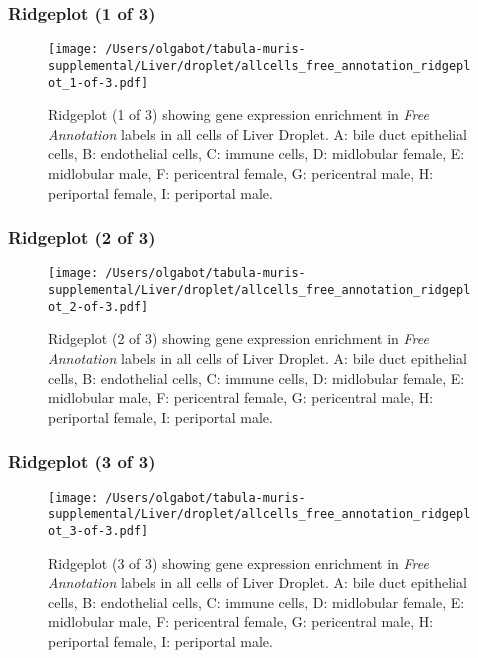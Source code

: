 \subsubsection{Ridgeplot (1 of 3)}
\begin{figure}[h]
\centering
\texttt{[image: /Users/olgabot/tabula-muris-supplemental/Liver/droplet/allcells\_free\_annotation\_ridgeplot\_1-of-3.pdf]}

\caption{ Ridgeplot (1 of 3)  showing gene expression enrichment in \emph{Free Annotation} labels in all cells of Liver Droplet. A: bile duct epithelial cells, B: endothelial cells, C: immune cells, D: midlobular female, E: midlobular male, F: pericentral female, G: pericentral male, H: periportal female, I: periportal male.}
\end{figure}


\clearpage

\subsubsection{Ridgeplot (2 of 3)}
\begin{figure}[h]
\centering
\texttt{[image: /Users/olgabot/tabula-muris-supplemental/Liver/droplet/allcells\_free\_annotation\_ridgeplot\_2-of-3.pdf]}

\caption{ Ridgeplot (2 of 3)  showing gene expression enrichment in \emph{Free Annotation} labels in all cells of Liver Droplet. A: bile duct epithelial cells, B: endothelial cells, C: immune cells, D: midlobular female, E: midlobular male, F: pericentral female, G: pericentral male, H: periportal female, I: periportal male.}
\end{figure}


\clearpage

\subsubsection{Ridgeplot (3 of 3)}
\begin{figure}[h]
\centering
\texttt{[image: /Users/olgabot/tabula-muris-supplemental/Liver/droplet/allcells\_free\_annotation\_ridgeplot\_3-of-3.pdf]}

\caption{ Ridgeplot (3 of 3)  showing gene expression enrichment in \emph{Free Annotation} labels in all cells of Liver Droplet. A: bile duct epithelial cells, B: endothelial cells, C: immune cells, D: midlobular female, E: midlobular male, F: pericentral female, G: pericentral male, H: periportal female, I: periportal male.}
\end{figure}


